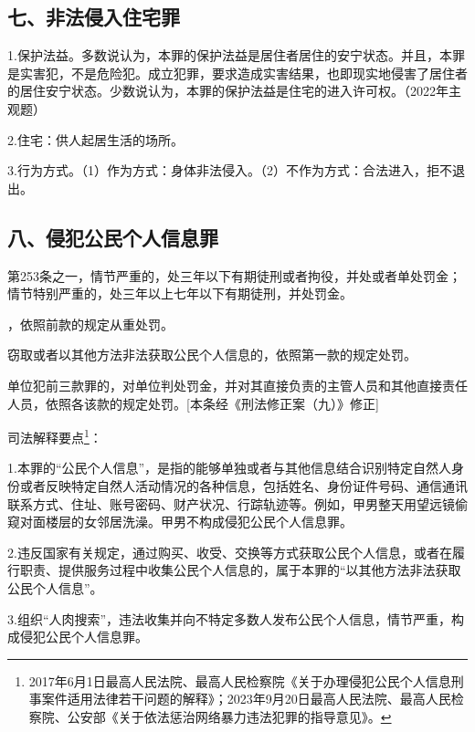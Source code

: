 \subsection*{七、非法侵入住宅罪}

1.保护法益。多数说认为，本罪的保护法益是居住者居住的安宁状态。并且，本罪是实害犯，不是危险犯。成立犯罪，要求造成实害结果，也即现实地侵害了居住者的居住安宁状态。少数说认为，本罪的保护法益是住宅的进入许可权。（2022年主观题）

2.住宅：供人起居生活的场所。

3.行为方式。（1）作为方式：身体非法侵入。（2）不作为方式：合法进入，拒不退出。

\subsection*{八、侵犯公民个人信息罪}

第253条之一，情节严重的，处三年以下有期徒刑或者拘役，并处或者单处罚金；情节特别严重的，处三年以上七年以下有期徒刑，并处罚金。

，依照前款的规定从重处罚。

窃取或者以其他方法非法获取公民个人信息的，依照第一款的规定处罚。

单位犯前三款罪的，对单位判处罚金，并对其直接负责的主管人员和其他直接责任人员，依照各该款的规定处罚。[本条经《刑法修正案（九）》修正]

司法解释要点\footnote{2017年6月1日最高人民法院、最高人民检察院《关于办理侵犯公民个人信息刑事案件适用法律若干问题的解释》；2023年9月20日最高人民法院、最高人民检察院、公安部《关于依法惩治网络暴力违法犯罪的指导意见》。}：

1.本罪的“公民个人信息”，是指的能够单独或者与其他信息结合识别特定自然人身份或者反映特定自然人活动情况的各种信息，包括姓名、身份证件号码、通信通讯联系方式、住址、账号密码、财产状况、行踪轨迹等。例如，甲男整天用望远镜偷窥对面楼层的女邻居洗澡。甲男不构成侵犯公民个人信息罪。

2.违反国家有关规定，通过购买、收受、交换等方式获取公民个人信息，或者在履行职责、提供服务过程中收集公民个人信息的，属于本罪的“以其他方法非法获取公民个人信息”。

3.组织“人肉搜索”，违法收集并向不特定多数人发布公民个人信息，情节严重，构成侵犯公民个人信息罪。

